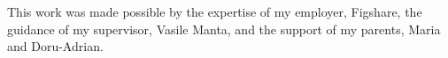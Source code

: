 \thispagestyle{empty}
This work was made possible by the expertise of my employer, Figshare, the guidance of my supervisor, Vasile Manta, and the support of my parents, Maria and Doru-Adrian.
